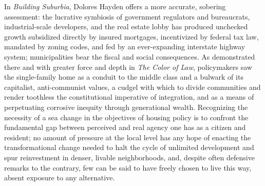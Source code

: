 \documentclass[oneside, a5paper]{book}
\begin{document}
In \textit{Building Suburbia}, Dolores Hayden offers a more accurate, sobering assessment: the lucrative symbiosis of government regulators and bureaucrats, industrial-scale developers, and the real estate lobby has produced unchecked growth subsidized directly by insured mortgages, incentivized by federal tax law, mandated by zoning codes, and fed by an ever-expanding interstate highway system; municipalities bear the fiscal and social consequences. As demonstrated there and with greater force and depth in \textit{The Color of Law}, policymakers saw the single-family home as a conduit to the middle class and a bulwark of its capitalist, anti-communist values, a cudgel with which to divide communities and render toothless the constitutional imperative of integration, and as a means of perpetuating corrosive inequity through generational wealth. Recognizing the necessity of a sea change in the objectives of housing policy is to confront the fundamental gap between perceived and real agency one has as a citizen and resident; no amount of pressure at the local level has any hope of enacting the transformational change needed to halt the cycle of unlimited development and spur reinvestment in denser, livable neighborhoods, and, despite often defensive remarks to the contrary, few can be said to have freely chosen to live this way, absent exposure to any alternative.
\end{document}

